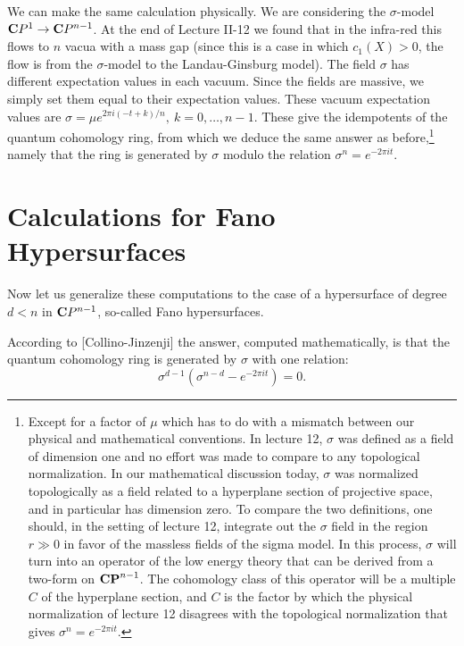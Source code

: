 We can make the same calculation physically. We are considering the
$\sigma$-model ${\bf C}P^1\to {\bf C}P^{n-1}$. At the end of Lecture II-12 we
found that  in the infra-red this flows to $n$ vacua with a mass gap
(since this is a case in which $c_1(X)>0$, the flow is from the
$\sigma$-model to the Landau-Ginsburg model). The field $\sigma$ has
different expectation values in each vacuum.  Since the fields are
massive, we simply set them equal to their expectation values. These
vacuum expectation values
are $\sigma=\mu e^{2\pi i(-t+k)/n}, \ k=0,\ldots,n-1$.
These give the idempotents of the quantum cohomology ring, from which
we deduce the same answer as before,\footnote{Except for a factor of $\mu$
which has to do with a mismatch between our physical and mathematical
conventions.  In lecture 12, $\sigma$ was defined as a field of dimension
one and no effort was made to compare to any topological normalization.
In our mathematical discussion today, $\sigma$ was normalized topologically
as a field related to a hyperplane section of projective space, and
in particular has dimension zero.  To compare the two definitions,
one should, in the setting of lecture 12, integrate out the $\sigma$
field in the region $r\gg 0$ in favor of the massless fields of the sigma
model.  In this process, $\sigma$ will turn into an operator of the low
energy theory that can be derived from a two-form on ${\bf CP}^{n-1}$.
The cohomology class of this operator will be a multiple $C$ of
the hyperplane section, and $C$ is the factor by which the physical
normalization of lecture 12 disagrees with the topological normalization
that gives $\sigma^n=e^{-2\pi it}$.}
 namely that the ring is generated
by $\sigma$ modulo the relation $\sigma^n=e^{-2\pi it}$.

\section{Calculations for Fano Hypersurfaces}

Now let us generalize these computations to the case of a hypersurface
of degree $d<n$ in ${\bf C}P^{n-1}$, so-called Fano hypersurfaces.

According to [Collino-Jinzenji] the answer, computed mathematically, is
that the quantum cohomology ring is generated by $\sigma$ with one
relation:
\begin{equation}\label{quantumFano}
\sigma^{d-1}\left(\sigma^{n-d}-e^{-2\pi it}\right)=0.
\end{equation}

